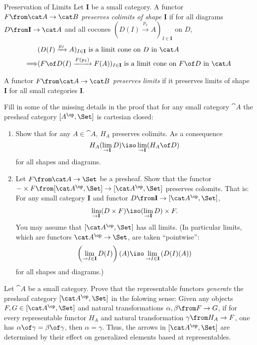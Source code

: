 \begin{definition}{Preservation of Limits}
  Let $\mathbf I$ be a small category. A functor $F\from \cat A\to\cat B$ \emph{preserves colimits of shape $\mathbf I$} if for all diagrams $D\from\mathbf I\to\cat A$ and all cocones $(D(I)\xrightarrow{p_I}A)_{I\in \mathbf I}$ on $D$,
  \begin{align*}
    &(D(I)\xrightarrow{p_I}A)_{I\in \mathbf I} \text{ is a limit cone on $D$ in } \cat A\\
    \Longrightarrow&(F\of D(I)\xrightarrow{F(p_I)}F(A))_{I\in \mathbf I} \text{ is a limit cone on $F\of D$ in } \cat A
  \end{align*}

  A functor $F\from \cat A\to\cat B$ \emph{preserves limits} if it preserves limits of shape $\mathbf I$ for all small categories $\mathbf I$.
\end{definition}
\begin{exercise}
  Fill in some of the missing details in the proof that for any small category $\cat A$ the presheaf category $[A^\op,\Set]$ is cartesian closed:
  \begin{enumerate}
  \item Show that for any $A\in\cat A$, $H_A$ preserves colimits. As a consequence $$H_A(\lim_{\to\mathbf I} D)\iso \lim_{\to\mathbf I}(H_A\of D)$$ for all shapes and diagrams.
  \item Let $F\from \cat A\to\Set$ be a presheaf. Show that the functor $-\times F\from [\cat A^\op,\Set]\to[\cat A^\op,\Set]$ preserves colomits. That is: For any small category $\mathbf I$ and functor $D\from\mathbf I\to [\cat A^\op,\Set]$,
    \begin{align*}
      \lim_{\to \mathbf I} (D\times F)\iso (\lim_{\to \mathbf I} D)\times F.
    \end{align*}
    You may assume that $[\cat A^\op,\Set]$ has all limits. (In particular limits, which are functors $\cat A^\op\to\Set$, are taken ``pointwise'': $$\left(\lim_{\to I\in\mathbf I} D(I)\right)(A) \iso \lim_{\to I\in\mathbf I} \left(D(I)(A)\right)$$ for all shapes and diagrams.)
  \end{enumerate}
\end{exercise}

\begin{exercise}
  Let $\cat A$ be a small category. Prove that the representable functors \emph{generate} the presheaf category $[\cat A^\op,\Set]$ in the folowing sense: Given any objects $F,G\in[\cat A^\op,\Set]$ and natural transformations $\alpha,\beta\from F\to G$, if for every representable functor $H_A$ and natural transformation $\gamma\from H_A\to F$, one has $\alpha\of\gamma=\beta\of\gamma$, then $\alpha=\gamma$. Thus, the arrows in $[\cat A^\op,\Set]$ are determined by their effect on generalized elements based at representables.
\end{exercise}

